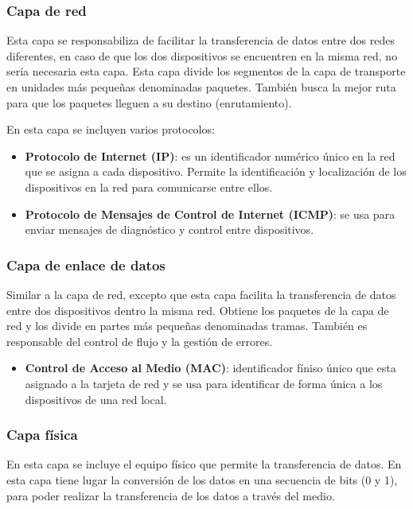\subsubsection{Capa de red}
\label{subsubsec:capa_red}
Esta capa se responsabiliza de facilitar la transferencia de datos entre dos redes diferentes, en caso de que los dos dispositivos se encuentren en la misma red, no sería necesaria esta capa. Esta capa divide los segmentos de la capa de transporte en unidades más pequeñas denominadas paquetes. También busca la mejor ruta para que los paquetes lleguen a su destino (enrutamiento).

En esta capa se incluyen varios protocolos:
\begin{itemize}
    \item \textbf{Protocolo de Internet (IP)}: es un identificador numérico único en la red que se asigna a cada dispositivo. Permite la identificación y localización de los dispositivos en la red para comunicarse entre ellos. 
    \item \textbf{Protocolo de Mensajes de Control de Internet (ICMP)}: se usa para enviar mensajes de diagnóstico y control entre dispositivos.
\end{itemize}

\subsubsection{Capa de enlace de datos}
\label{subsubsec:capa_enlace_datos}
Similar a la capa de red, excepto que esta capa facilita la transferencia de datos entre dos dispositivos dentro la misma red. Obtiene los paquetes de la capa de red y los divide en partes más pequeñas denominadas tramas. También es responsable del control de flujo y la gestión de errores.

\begin{itemize}
    \item \textbf{Control de Acceso al Medio (MAC)}: identificador fíniso único que esta asignado a la tarjeta de red y se usa para identificar de forma única a los dispositivos de una red local.
\end{itemize}

\subsubsection{Capa física}
\label{subsubsec:capa_fisica}
En esta capa se incluye el equipo físico que permite la transferencia de datos. En esta capa tiene lugar la conversión de los datos en una secuencia de bits (0 y 1), para poder realizar la transferencia de los datos a través del medio.

